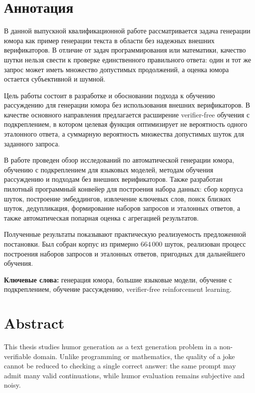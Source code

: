 \chapter*{Аннотация}
{}

В данной выпускной квалификационной работе рассматривается задача генерации юмора как пример генерации текста в области без надежных внешних верификаторов. В отличие от задач программирования или математики, качество шутки нельзя свести к проверке единственного правильного ответа: один и тот же запрос может иметь множество допустимых продолжений, а оценка юмора остается субъективной и шумной.

Цель работы состоит в разработке и обосновании подхода к обучению рассуждению для генерации юмора без использования внешних верификаторов. В качестве основного направления предлагается расширение verifier-free обучения с подкреплением, в котором целевая функция оптимизирует не вероятность одного эталонного ответа, а суммарную вероятность множества допустимых шуток для заданного запроса.

В работе проведен обзор исследований по автоматической генерации юмора, обучению с подкреплением для языковых моделей, методам обучения рассуждению и подходам без внешних верификаторов. Также разработан пилотный программный конвейер для построения набора данных: сбор корпуса шуток, построение эмбеддингов, извлечение ключевых слов, поиск близких шуток, дедупликация, формирование наборов запросов и эталонных ответов, а также автоматическая попарная оценка с агрегацией результатов.

Полученные результаты показывают практическую реализуемость предложенной постановки. Был собран корпус из примерно \(664\,000\) шуток, реализован процесс построения наборов запросов и эталонных ответов, пригодных для дальнейшего обучения.

\textbf{Ключевые слова:} генерация юмора, большие языковые модели, обучение с подкреплением, обучение рассуждению, verifier-free reinforcement learning.

\clearpage

\chapter*{Abstract}
{}

This thesis studies humor generation as a text generation problem in a non-verifiable domain. Unlike programming or mathematics, the quality of a joke cannot be reduced to checking a single correct answer: the same prompt may admit many valid continuations, while humor evaluation remains subjective and noisy.

